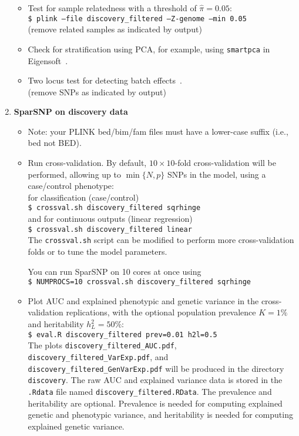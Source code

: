 \documentclass[a4paper,11pt]{article}
\begin{document}
\begin{enumerate}
\begin{itemize}
      \item Test for sample relatedness with a threshold of $\hat{\pi}=0.05$: \\
      \texttt{\$ plink --file discovery\_filtered --Z-genome --min 0.05} \\
      (remove related samples as indicated by output)

      \item Check for stratification using PCA, for example, using
      \texttt{smartpca} in Eigensoft~\citep{price2006}.

      \item Two locus test for detecting batch effects~\citep{lee2010b}. \\
      (remove SNPs as indicated by output)

      \end{itemize}

   \item \textbf{SparSNP on discovery data}


      \begin{itemize}

	 \item Note: your PLINK bed/bim/fam files must have a lower-case suffix
	 (i.e., bed not BED).

	 \item Run cross-validation. By default, $10\times10$-fold
	 cross-validation will be performed, allowing up to $\min \{N, p\}$ SNPs
	 in the model, using a case/control phenotype: \\ for classification
	 (case/control)\\ \texttt{\$ crossval.sh discovery\_filtered sqrhinge}\\
	 and for continuous outputs (linear regression)\\ \texttt{\$ crossval.sh
	 discovery\_filtered linear}\\ The \texttt{crossval.sh} script can be
	 modified to perform more cross-validation folds or to tune the model
	 parameters.

	 You can run SparSNP on 10 cores at once using\\
	 \texttt{\$ NUMPROCS=10 crossval.sh discovery\_filtered sqrhinge}

	 \item Plot AUC and explained phenotypic and genetic variance in the
	 cross-validation replications, with the optional
	 population prevalence $K=1\%$ and heritability $h^2_L=50\%$:\\
	 \texttt{\$ eval.R discovery\_filtered prev=0.01 h2l=0.5} \\
	 The plots \texttt{discovery\_filtered\_AUC.pdf},
	 \texttt{discovery\_filtered\_VarExp.pdf}, and
	 \texttt{discovery\_filtered\_GenVarExp.pdf}
	 will be produced in the
	 directory \texttt{discovery}.
	 The raw AUC and explained variance data is stored in the
	 \texttt{.Rdata} file named \texttt{discovery\_filtered.RData}.
	 The prevalence and heritability are optional. Prevalence is needed
	 for computing explained genetic and phenotypic variance, and heritability is
	 needed for computing explained genetic variance.


\end{itemize}
\end{enumerate}
\end{document}
